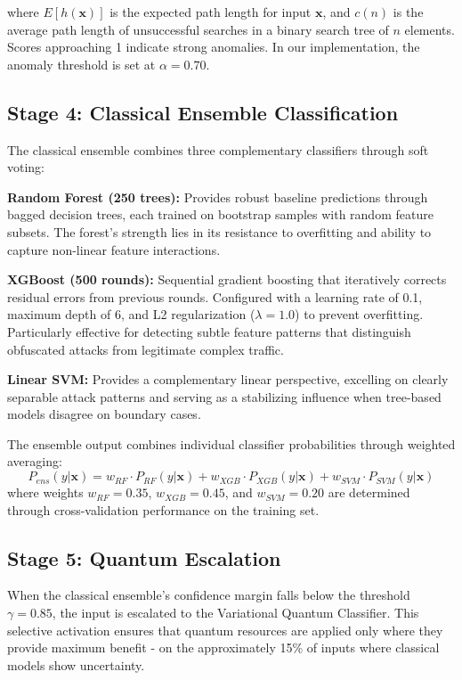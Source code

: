 \documentclass[journal,onecolumn]{IEEEtran}
\begin{document}
where $E[h(\mathbf{x})]$ is the expected path length for input $\mathbf{x}$, and $c(n)$ is the average path length of unsuccessful searches in a binary search tree of $n$ elements. Scores approaching 1 indicate strong anomalies. In our implementation, the anomaly threshold is set at $\alpha = 0.70$.

\subsection{Stage 4: Classical Ensemble Classification}
The classical ensemble combines three complementary classifiers through soft voting:

\textbf{Random Forest (250 trees):} Provides robust baseline predictions through bagged decision trees, each trained on bootstrap samples with random feature subsets. The forest's strength lies in its resistance to overfitting and ability to capture non-linear feature interactions.

\textbf{XGBoost (500 rounds):} Sequential gradient boosting that iteratively corrects residual errors from previous rounds. Configured with a learning rate of 0.1, maximum depth of 6, and L2 regularization ($\lambda = 1.0$) to prevent overfitting. Particularly effective for detecting subtle feature patterns that distinguish obfuscated attacks from legitimate complex traffic.

\textbf{Linear SVM:} Provides a complementary linear perspective, excelling on clearly separable attack patterns and serving as a stabilizing influence when tree-based models disagree on boundary cases.

The ensemble output combines individual classifier probabilities through weighted averaging:
\begin{equation}
P_{ens}(y|\mathbf{x}) = w_{RF} \cdot P_{RF}(y|\mathbf{x}) + w_{XGB} \cdot P_{XGB}(y|\mathbf{x}) + w_{SVM} \cdot P_{SVM}(y|\mathbf{x})
\end{equation}
where weights $w_{RF} = 0.35$, $w_{XGB} = 0.45$, and $w_{SVM} = 0.20$ are determined through cross-validation performance on the training set.

\subsection{Stage 5: Quantum Escalation}
When the classical ensemble's confidence margin falls below the threshold $\gamma = 0.85$, the input is escalated to the Variational Quantum Classifier. This selective activation ensures that quantum resources are applied only where they provide maximum benefit - on the approximately 15\% of inputs where classical models show uncertainty.
\end{document}
